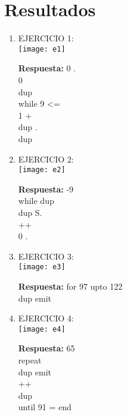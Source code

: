 \documentclass[conference]{IEEEtran}
\begin{document}
\section{Resultados}
\begin{enumerate}
\item  EJERCICIO 1:\\
	\texttt{[image: e1]} \\
	\begin{center}
	\textbf{Respuesta: } 0 . \\ 0 \\ dup \\ while 9 <= \\ 1 + \\ dup . \\ dup
	\end{center}
	
\item  EJERCICIO 2:\\
	\texttt{[image: e2]} \\
	\begin{center}
	\textbf{Respuesta: } -9 \\ while dup \\ dup S. \\ ++ \\ 0 .
	\end{center}
	
\item  EJERCICIO 3:\\
	\texttt{[image: e3]} \\
	\begin{center}
	\textbf{Respuesta: } for 97 upto 122 \\ dup emit 
	\end{center}
\newpage
\item  EJERCICIO 4:\\
	\texttt{[image: e4]} \\
	\begin{center}
	\textbf{Respuesta: } 65 \\ repeat \\ dup emit \\ ++ \\ dup \\ until 91 = end
	\end{center}

\end{enumerate}
\newpage
\end{document}
